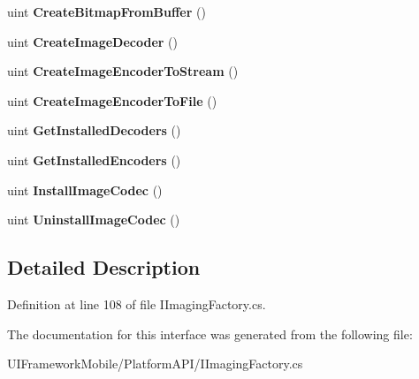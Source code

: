 \begin{DoxyCompactItemize}
\item 
\hypertarget{interface_microsoft_1_1_drawing_1_1_i_imaging_factory_ac0db9a39776f8fc0fef0c5e1419d5c9a}{
uint {\bfseries CreateBitmapFromBuffer} ()}
\label{interface_microsoft_1_1_drawing_1_1_i_imaging_factory_ac0db9a39776f8fc0fef0c5e1419d5c9a}

\item 
\hypertarget{interface_microsoft_1_1_drawing_1_1_i_imaging_factory_a940943445fa70828258115bdb5cc569c}{
uint {\bfseries CreateImageDecoder} ()}
\label{interface_microsoft_1_1_drawing_1_1_i_imaging_factory_a940943445fa70828258115bdb5cc569c}

\item 
\hypertarget{interface_microsoft_1_1_drawing_1_1_i_imaging_factory_ad3a31e0aa04046aab0c697bacd910fb5}{
uint {\bfseries CreateImageEncoderToStream} ()}
\label{interface_microsoft_1_1_drawing_1_1_i_imaging_factory_ad3a31e0aa04046aab0c697bacd910fb5}

\item 
\hypertarget{interface_microsoft_1_1_drawing_1_1_i_imaging_factory_a651503c7cbc6ddbbcc0b9b83c3c1c9e2}{
uint {\bfseries CreateImageEncoderToFile} ()}
\label{interface_microsoft_1_1_drawing_1_1_i_imaging_factory_a651503c7cbc6ddbbcc0b9b83c3c1c9e2}

\item 
\hypertarget{interface_microsoft_1_1_drawing_1_1_i_imaging_factory_a72ddaa3c7e580b850d9ab1832e99ac29}{
uint {\bfseries GetInstalledDecoders} ()}
\label{interface_microsoft_1_1_drawing_1_1_i_imaging_factory_a72ddaa3c7e580b850d9ab1832e99ac29}

\item 
\hypertarget{interface_microsoft_1_1_drawing_1_1_i_imaging_factory_a7083978f98510dd6b18a98b716e5bb0e}{
uint {\bfseries GetInstalledEncoders} ()}
\label{interface_microsoft_1_1_drawing_1_1_i_imaging_factory_a7083978f98510dd6b18a98b716e5bb0e}

\item 
\hypertarget{interface_microsoft_1_1_drawing_1_1_i_imaging_factory_a59a589d3c7afa529d840fc1cc3ba9c71}{
uint {\bfseries InstallImageCodec} ()}
\label{interface_microsoft_1_1_drawing_1_1_i_imaging_factory_a59a589d3c7afa529d840fc1cc3ba9c71}

\item 
\hypertarget{interface_microsoft_1_1_drawing_1_1_i_imaging_factory_acce030a35eac4814a149547013efe4f3}{
uint {\bfseries UninstallImageCodec} ()}
\label{interface_microsoft_1_1_drawing_1_1_i_imaging_factory_acce030a35eac4814a149547013efe4f3}

\end{DoxyCompactItemize}


\subsection{Detailed Description}


Definition at line 108 of file IImagingFactory.cs.

The documentation for this interface was generated from the following file:\begin{DoxyCompactItemize}
\item 
UIFrameworkMobile/PlatformAPI/IImagingFactory.cs\end{DoxyCompactItemize}
